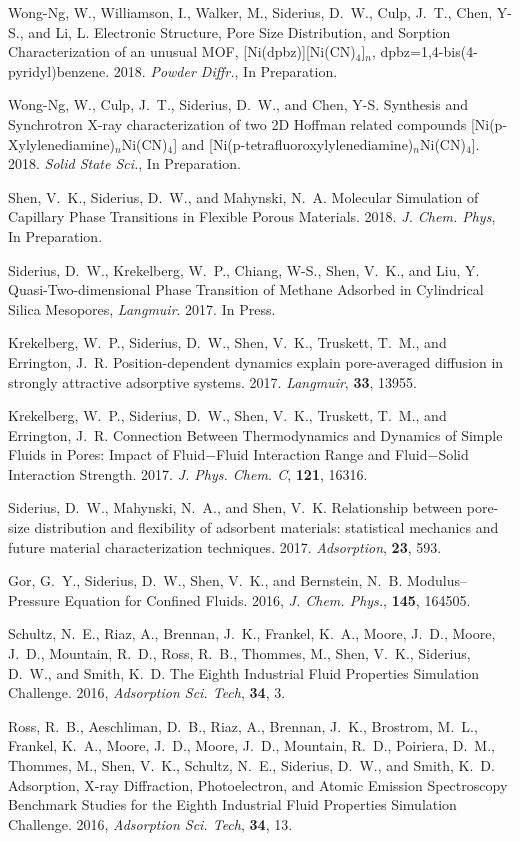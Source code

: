 Wong-Ng, W., Williamson, I., Walker, M., Siderius, D.~W., Culp, J.~T., Chen, Y-S., and Li, L. Electronic Structure, Pore Size Distribution, and Sorption Characterization of an unusual MOF, {[Ni(dpbz)][Ni(CN)$_4$]}$_n$, dpbz=1,4-bis(4-pyridyl)benzene. 2018. {\it Powder Diffr.}, In Preparation.

Wong-Ng, W., Culp, J.~T., Siderius, D.~W., and Chen, Y-S. Synthesis and Synchrotron X-ray characterization of two 2D Hoffman related compounds [Ni(p-Xylylenediamine)$_n$Ni(CN)$_4$] and [Ni(p-tetrafluoroxylylenediamine)$_n$Ni(CN)$_4$]. 2018. {\it Solid State Sci.}, In Preparation.

Shen, V.~K., Siderius, D.~W., and Mahynski, N.~A. Molecular Simulation of Capillary Phase Transitions in Flexible Porous Materials. 2018. {\it J. Chem. Phys}, In Preparation.

Siderius, D.~W., Krekelberg, W.~P., Chiang, W-S., Shen, V.~K., and Liu, Y. Quasi-Two-dimensional Phase Transition of Methane Adsorbed in Cylindrical Silica Mesopores, {\it Langmuir}. 2017. In Press.

Krekelberg, W.~P., Siderius, D.~W., Shen, V.~K., Truskett, T.~M., and Errington, J.~R. Position-dependent dynamics explain pore-averaged diffusion in strongly attractive adsorptive systems. 2017. {\it Langmuir}, {\bf 33}, 13955.

Krekelberg, W.~P., Siderius, D.~W., Shen, V.~K., Truskett, T.~M., and Errington, J.~R. Connection Between Thermodynamics and Dynamics of Simple Fluids in Pores: Impact of Fluid−Fluid Interaction Range and Fluid−Solid Interaction Strength. 2017. {\it J. Phys. Chem. C}, {\bf 121}, 16316.

Siderius, D.~W., Mahynski, N.~A., and Shen, V.~K. Relationship between pore-size distribution and flexibility of adsorbent materials: statistical mechanics and future material characterization techniques. 2017. {\it Adsorption}, {\bf 23}, 593.

Gor, G.~Y., Siderius, D.~W., Shen, V.~K., and Bernstein, N.~B. Modulus--Pressure Equation for Confined Fluids. 2016, {\it J. Chem. Phys.}, {\bf 145}, 164505.

Schultz, N.~E., Riaz, A., Brennan, J.~K., Frankel, K.~A., Moore, J.~D., Moore, J.~D., Mountain, R.~D., Ross, R.~B., Thommes, M., Shen, V.~K., Siderius, D.~W., and Smith, K.~D. The Eighth Industrial Fluid Properties Simulation Challenge. 2016, {\it Adsorption Sci. Tech}, {\bf 34}, 3.

Ross, R.~B., Aeschliman, D.~B., Riaz, A., Brennan, J.~K., Brostrom, M.~L., Frankel, K.~A., Moore, J.~D., Moore, J.~D., Mountain, R.~D., Poiriera, D.~M., Thommes, M., Shen, V.~K., Schultz, N.~E., Siderius, D.~W., and Smith, K.~D. Adsorption, X-ray Diffraction, Photoelectron, and Atomic Emission Spectroscopy Benchmark Studies for the Eighth Industrial Fluid Properties Simulation Challenge. 2016, {\it Adsorption Sci. Tech}, {\bf 34}, 13.

